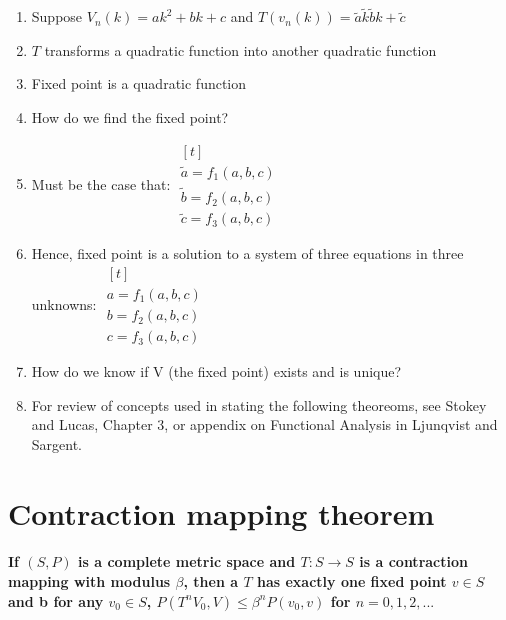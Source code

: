 \documentclass{article}
\begin{document}
\begin{enumerate}
    \item Suppose $V_n(k) = ak^2 + bk + c$ and $T(v_n(k)) = \tilde{a} \tilde{k} \tilde{b}k + \tilde{c}$
    \item $T$ transforms a quadratic function into another quadratic function
    \item Fixed point is a quadratic function
    \item How do we find the fixed point?
    \item Must be the case that: $\begin{aligned}[t] \\ \tilde{a} = f_1(a,b,c) \\
    \tilde{b} = f_2(a,b,c) \\
    \tilde{c} = f_3(a, b, c)
    \end{aligned}$
    \item Hence, fixed point is a solution to a system of three equations in three unknowns: $\begin{aligned}[t] \\
    a = f_1(a,b,c) \\
    b = f_2(a,b,c) \\
    c = f_3(a,b,c)
    \end{aligned}$
    \item How do we know if V (the fixed point) exists and is unique?
    \item For review of concepts used in stating the following theoreoms, see Stokey and Lucas, Chapter 3, or
    appendix on Functional Analysis in Ljunqvist and Sargent.
\end{enumerate}

\section{Contraction mapping theorem}

\paragraph{If $(S,P)$ is a complete metric space and 
$T:S \rightarrow S$ is a 
contraction mapping with modulus $\beta$, then a $T$ has exactly one fixed point $v \in S$ 
and b for any $v_0 \in S$, $P(T^nV_0,V) \leq \beta^n P(v_0,v)$ for $n = 0,1,2,...$}
\end{document}
